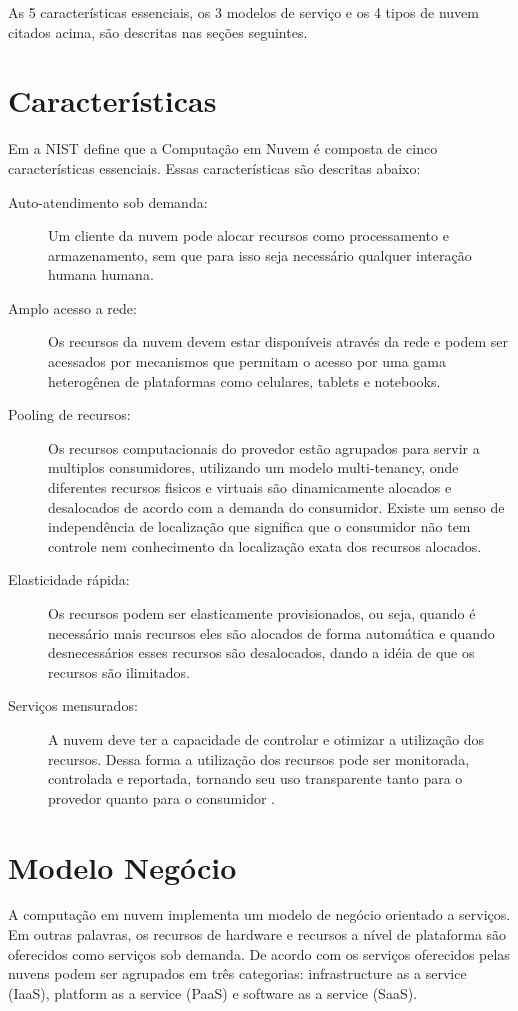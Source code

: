 	As 5 características essenciais, os 3 modelos de serviço e os 4 tipos de nuvem citados acima, são descritas nas seções seguintes.		

\section{Características}
	Em \cite{NIST:2011} a NIST define que a Computação em Nuvem é composta de cinco características essenciais. Essas características são descritas abaixo:   

\begin{description}

	\item[Auto-atendimento sob demanda:] Um cliente da nuvem pode alocar recursos como processamento e armazenamento, sem que para isso seja necessário qualquer interação humana humana.
	
	\item[Amplo acesso a rede:] Os recursos da nuvem devem estar disponíveis através da rede e podem ser acessados por mecanismos que permitam o acesso por uma gama heterogênea de plataformas como celulares, tablets e notebooks.
	
	\item[Pooling de recursos:] Os recursos computacionais do provedor estão agrupados para servir a multiplos consumidores, utilizando um modelo multi-tenancy, onde diferentes recursos fisicos e virtuais são dinamicamente alocados e desalocados de acordo com a demanda do consumidor. Existe um senso de independência de localização que significa que o consumidor não tem controle nem conhecimento da localização exata dos recursos alocados.
	
	\item[Elasticidade rápida:] Os recursos podem ser elasticamente provisionados, ou seja, quando é necessário mais recursos eles são alocados de forma automática e quando desnecessários esses recursos são desalocados, dando a idéia de que os recursos são ilimitados.
	
	\item[Serviços mensurados:] A nuvem deve ter a capacidade de controlar e otimizar a utilização dos recursos. Dessa forma a utilização dos recursos pode ser monitorada, controlada e reportada, tornando seu uso transparente tanto para o provedor quanto para o consumidor .

\end{description} 



\section{Modelo Negócio}
A computação em nuvem implementa um modelo de negócio orientado a serviços. Em outras palavras, os recursos de hardware e recursos a nível de plataforma são oferecidos como serviços sob demanda. De acordo com \citep{stateOfArt:2010} os serviços oferecidos pelas nuvens podem ser agrupados em três categorias: infrastructure as a service (IaaS), platform as a service (PaaS) e software as a service (SaaS).

